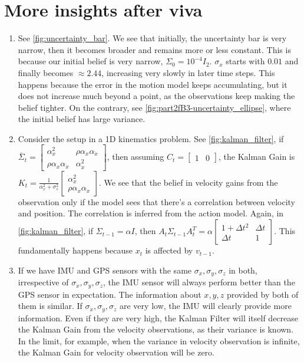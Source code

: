 \section{More insights after viva}
\begin{enumerate}
    \item See \autoref{fig:uncertainty_bar}. We see that initially, the uncertainty bar is very narrow, then it becomes broader and remains more or less constant. This is because our initial belief is very narrow, $\Sigma_0 = 10^{-4}I_2$. $\sigma_{x}$ starts with $0.01$ and finally becomes $\approx 2.44$, increasing very slowly in later time steps. This happens because the error in the motion model keeps accumulating, but it does not increase much beyond a point, as the observations keep making the belief tighter. On the contrary, see \autoref{fig:part2fB3-uncertainty_ellipse}, where the initial belief has large variance.

    \item Consider the setup in a 1D kinematics problem. See \autoref{fig:kalman_filter}, if $\bar{\Sigma}_t = \begin{bmatrix}
        \alpha_x^2 & \rho \alpha_x \alpha_{\dot{x}}\\
        \rho \alpha_x \alpha_{\dot{x}}  & \alpha_{\dot{x}}^2
    \end{bmatrix}$, then assuming $C_t = \begin{bmatrix}1 & 0\end{bmatrix}$, the Kalman Gain is $K_t = \frac{1}{\alpha_x^2 + \sigma_s^2}\begin{bmatrix}
        \alpha_x^2 \\ \rho \alpha_x \alpha_{\dot{x}}
    \end{bmatrix}$. We see that the belief in velocity gains from the observation only if the model sees that there's a correlation between velocity and position. The correlation is inferred from the action model. Again, in \autoref{fig:kalman_filter}, if $\Sigma_{t - 1} = \alpha I$, then $A_t\Sigma_{t - 1}A_t^T = \alpha \begin{bmatrix}
        1 + \Delta t ^ 2 & \Delta t\\
        \Delta t & 1
    \end{bmatrix}$. This fundamentally happens because $x_t$ is affected by $v_{t - 1}$.

    \item If we have IMU and GPS sensors with the same $\sigma_x, \sigma_y, \sigma_z$ in both, irrespective of $\sigma_{\dot{x}}, \sigma_{\dot{y}}, \sigma_{\dot{z}}$, the IMU sensor will always perform better than the GPS sensor in expectation. The information about $x, y, z$ provided by both of them is similar. If $\sigma_{\dot{x}}, \sigma_{\dot{y}}, \sigma_{\dot{z}}$ are very low, the IMU will clearly provide more information. Even if they are very high, the Kalman Filter will itself decrease the Kalman Gain from the velocity observations, as their variance is known. In the limit, for example, when the variance in velocity observation is infinite, the Kalman Gain for velocity observation will be zero.


\end{enumerate}
